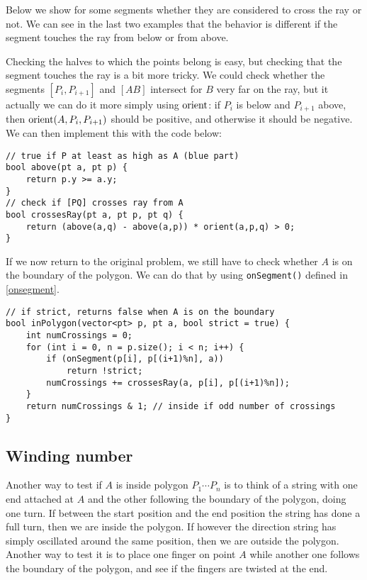 
Below we show for some segments whether they are considered to cross the ray or not. We can see in the last two examples that the behavior is different if the segment touches the ray from below or from above.

\begin{center}
\end{center}


Checking the halves to which the points belong is easy, but checking that the segment touches the ray is a bit more tricky. We could check whether the segments $[P_i,P_{i+1}]$ and $[AB]$ intersect for $B$ very far on the ray, but it actually we can do it more simply using $\operatorname{orient}$: if $P_i$ is below and $P_{i+1}$ above, then $\operatorname{orient}(A,P_i,P_{i+1})$ should be positive, and otherwise it should be negative.
We can then implement this with the code below:
\begin{lstlisting}
// true if P at least as high as A (blue part)
bool above(pt a, pt p) {
    return p.y >= a.y;
}
// check if [PQ] crosses ray from A
bool crossesRay(pt a, pt p, pt q) {
    return (above(a,q) - above(a,p)) * orient(a,p,q) > 0;
}
\end{lstlisting}

If we now return to the original problem, we still have to check whether $A$ is on the boundary of the polygon. We can do that by using \lstinline|onSegment()| defined in \ref{onsegment}.
\begin{lstlisting}
// if strict, returns false when A is on the boundary
bool inPolygon(vector<pt> p, pt a, bool strict = true) {
    int numCrossings = 0;
    for (int i = 0, n = p.size(); i < n; i++) {
        if (onSegment(p[i], p[(i+1)%n], a))
            return !strict;
        numCrossings += crossesRay(a, p[i], p[(i+1)%n]);
    }
    return numCrossings & 1; // inside if odd number of crossings
}
\end{lstlisting}

\subsection{Winding number}\label{ss:wind-2d}
Another way to test if $A$ is inside polygon $P_1 \cdots P_n$ is to think of a string with one end attached at $A$ and the other following the boundary of the polygon, doing one turn. If between the start position and the end position the string has done a full turn, then we are inside the polygon. If however the direction string has simply oscillated around the same position, then we are outside the polygon. Another way to test it is to place one finger on point $A$ while another one follows the boundary of the polygon, and see if the fingers are twisted at the end.


